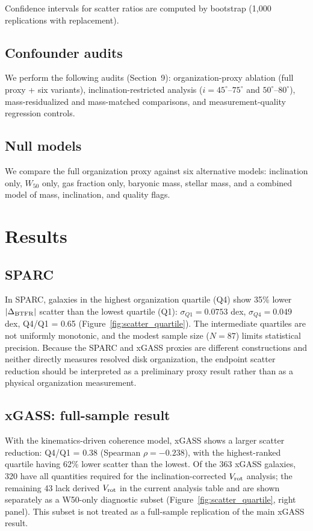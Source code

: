 \documentclass[11pt]{article}
\begin{document}
Confidence intervals for scatter ratios are computed by bootstrap (1,000 replications with replacement).

\subsection{Confounder audits}

We perform the following audits (Section~9): organization-proxy ablation (full proxy + six variants), inclination-restricted analysis ($i=45^\circ$--$75^\circ$ and $50^\circ$--$80^\circ$), mass-residualized and mass-matched comparisons, and measurement-quality regression controls.

\subsection{Null models}

We compare the full organization proxy against six alternative models: inclination only, $W_{50}$ only, gas fraction only, baryonic mass, stellar mass, and a combined model of mass, inclination, and quality flags.

\section{Results}

\subsection{SPARC}

In SPARC, galaxies in the highest organization quartile (Q4) show 35\% lower $|\Delta_{\rm BTFR}|$ scatter than the lowest quartile (Q1): $\sigma_{Q1} = 0.0753$ dex, $\sigma_{Q4} = 0.049$ dex, Q4/Q1 = 0.65 (Figure~\ref{fig:scatter_quartile}). The intermediate quartiles are not uniformly monotonic, and the modest sample size ($N=87$) limits statistical precision. Because the SPARC and xGASS proxies are different constructions and neither directly measures resolved disk organization, the endpoint scatter reduction should be interpreted as a preliminary proxy result rather than as a physical organization measurement.

\subsection{xGASS: full-sample result}

With the kinematics-driven coherence model, xGASS shows a larger scatter reduction: Q4/Q1 = 0.38 (Spearman $\rho = -0.238$), with the highest-ranked quartile having 62\% lower scatter than the lowest. Of the 363 xGASS galaxies, 320 have all quantities required for the inclination-corrected $V_{\rm rot}$ analysis; the remaining 43 lack derived $V_{\rm rot}$ in the current analysis table and are shown separately as a W50-only diagnostic subset (Figure~\ref{fig:scatter_quartile}, right panel). This subset is not treated as a full-sample replication of the main xGASS result.
\end{document}
